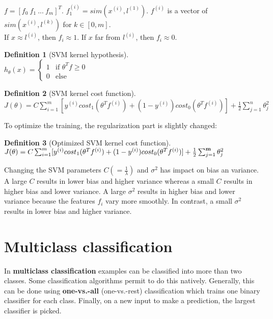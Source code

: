 \documentclass{report}
\newtheorem{definition}{Definition}[section]
\begin{document}
$f = [f_0\:f_1\:...\:f_m]^T$. $f_1^{(i)}=sim(x^{(i)},l^{(1)})$. $f^{(i)}$ is a vector of $sim(x^{(i)},l^{(k)})$ for $k \in [0,m]$. \\
If $x\approx l^{(i)}$, then $f_i\approx 1$. If $x$ far from $l^{(i)}$, then $f_i\approx 0$.

\begin{definition}[SVM kernel hypothesis]~\\
$h_{\theta}(x) =
\left\{
\begin{array}{lll}
1  & \mbox{if } \theta^Tf \ge 0 \\
0  & \mbox{else}
\end{array}
\right.$ \\
\end{definition}

\begin{definition}[SVM kernel cost function]~\\
$J(\theta)=C\sum_{i=1}^m[y^{(i)}cost_1(\theta^Tf^{(i)})+(1-y^{(i)})cost_0(\theta^Tf^{(i)})]+\frac{1}{2}\sum_{j=1}^n\theta_j^2$
\end{definition}

To optimize the training, the regularization part is slightly changed:
\begin{definition}[Optimized SVM kernel cost function]~\\
$J(\theta)=C\sum_{i=1}^m[y^{(i)}cost_1(\theta^Tf^{(i)})+(1-y^{(i)})cost_0(\theta^Tf^{(i)})]+\frac{1}{2}\sum_{j=1}^{\bf m}\theta_j^2$
\end{definition}

Changing the SVM parameters $C(=\frac{1}{\lambda})$ and $\sigma^2$ has impact on bias an variance.  A large $C$ results in lower bias and higher variance whereas a small $C$ results in higher bias and lower variance. A large $\sigma^2$ results in higher bias and lower variance because the features $f_i$ vary more smoothly. In contrast, a small $\sigma^2$ results in lower bias and higher variance.

\section{Multiclass classification}
In {\bf multiclass classification} examples can be classified into more than two classes. Some classification algorithms permit to do this natively. Generally, this can be done using {\bf one-vs.-all} (one-vs.-rest) classification which trains one binary classifier for each class. Finally, on a new input to make a prediction, the largest classifier is picked.
\end{document}
